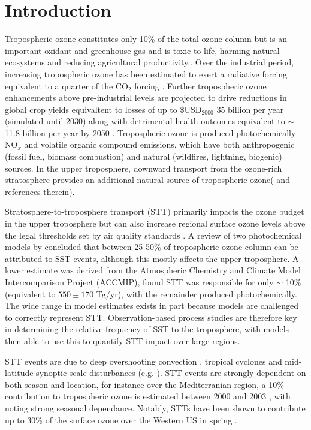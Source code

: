 \documentclass{article}
\begin{document}
\section{Introduction}

    Tropospheric ozone constitutes only 10\% of the total ozone column but is an important oxidant and greenhouse gas and is toxic to life, harming natural ecosystems and reducing agricultural productivity.. 
    Over the industrial period, increasing tropospheric ozone has been estimated to exert a radiative forcing equivalent to a quarter of the CO$_2$ forcing \citep{IPCC_Chapter2}. 
    Further tropospheric ozone enhancements above pre-industrial levels are projected to drive reductions in global crop yields equivaltent to losses of up to \$USD$_{2000}$ 35 billion per year (simulated until 2030) \citep{Avnery2011} along with detrimental health outcomes equivalent to $\sim$11.8 billion per year by 2050 \citep{Selin2009}.
    Tropospheric ozone is produced photochemically NO$_x$ and volatile organic compound emissions, which have both anthropogenic (fossil fuel, biomass combustion) and natural (wildfires, lightning, biogenic) sources.
    In the upper troposphere, downward transport from the ozone-rich stratosphere provides an additional natural source of tropospheric ozone(\citet{Jacobson2000} and references therein). 
 
    Stratosphere-to-troposphere transport (STT) primarily impacts the ozone budget in the upper troposphere but can also increase regional surface ozone levels above the legal thresholds set by air quality standards \citep{Danielson1968, Lefohn2011, Langford2012, Zhang2014}.
    A review of two photochemical models by \citet{Stohl2003} concluded that between 25-50\% of tropospheric ozone column can be attributed to SST events, although this mostly affects the upper troposphere.
    A lower estimate was derived from the Atmospheric Chemistry and Climate Model Intercomparison Project (ACCMIP), \citet{Stevenson2006} found STT was responsible for only $\sim$ 10\% (equivalent to $550\pm170$ Tg/yr), with the remainder produced photochemically.
    The wide range in model estimates exists in part because models are challenged to correctly represent STT.
    Observation-based process studies are therefore key in determining the relative frequency of SST to the troposphere, with models then able to use this to quantify STT impact over large regions.
    
    STT events are due to deep overshooting convection \citep{Frey2015}, tropical cyclones \citep{Das2016} and mid-latitude synoptic scale disturbances (e.g. \citet{Stohl2003,Mihalikova2012}).
    STT events are strongly dependent on both season and location, for instance over the Mediterranian region, a 10\% contribution to tropospheric ozone is estimated between 2000 and 2003 \citep{Galani2003}, with \citet{Lefohn2011} noting strong seasonal dependance.
    Notably, STTs have been shown to contribute up to 30\% of the surface ozone over the Western US in spring \citep{Lin2012}.
    
\end{document}
